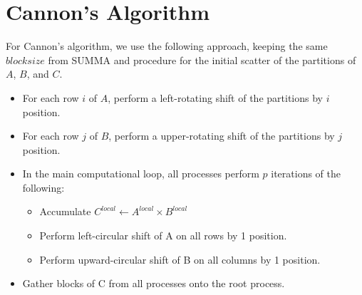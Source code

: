 \documentclass{article}
\begin{document}
\section{Cannon's Algorithm}
For Cannon's algorithm, we use the following approach, keeping the same $blocksize$ from SUMMA and procedure for the initial scatter of the partitions of $A$, $B$, and $C$.
\begin{itemize}
    \item For each row $i$ of $A$, perform a left-rotating shift of the partitions by $i$ position.
    \item For each row $j$ of $B$, perform a upper-rotating shift of the partitions by $j$ position.
    \item In the main computational loop, all processes perform $p$ iterations of the following:
    \begin{itemize}
        \item Accumulate $C^{local} \gets A^{local} \times B^{local}$
        \item Perform left-circular shift of A on all rows by 1 position.
        \item Perform upward-circular shift of B on all columns by 1 position.
    \end{itemize}
    \item Gather blocks of C from all processes onto the root process.
\end{itemize}
\end{document}
